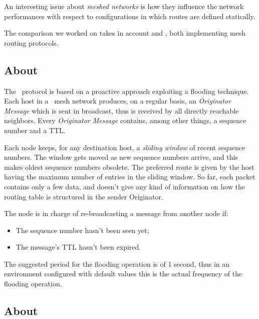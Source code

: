 An interesting issue about \emph{meshed networks} is how they influence
the network performances with respect to configurations in which routes are
defined statically.

The comparison we worked on takes in account \batman\cite{bib:BATMAN} and
\olsr\cite{bib:OLSR}, both implementing mesh routing protocols.

\subsection{About \batman}

    The \batman\ protocol is based on a proactive approach exploiting a
    flooding technique. Each host in a \batman\ mesh network produces, on a
    regular basis, an \emph{Originator Message} which is sent in
    broadcast, thus is received by all directly reachable neighbors. Every
    \emph{Originator Message} contains, among other things, a sequence
    number and a TTL.

    Each node keeps, for any destination host, a \emph{sliding window} of
    recent sequence numbers. The window gets moved as new sequence numbers
    arrive, and this makes oldest sequence numbers obsolete. The preferred
    route is given by the host having the maximum number of entries in the
    sliding window.  So far, each packet contains only a few data, and
    doesn't give any kind of information on how the routing table is
    structured in the sender Originator.

    The node is in charge of re-broadcasting a message from another node
    if:
    \begin{itemize}
    \item   The sequence number hasn't been seen yet;
    \item   The message's TTL hasn't been expired.
    \end{itemize}

    The suggested period for the flooding operation is of 1 second, thus
    in an environment configured with default values this is the actual
    frequency of the flooding operation.

\subsection{About \olsr}


